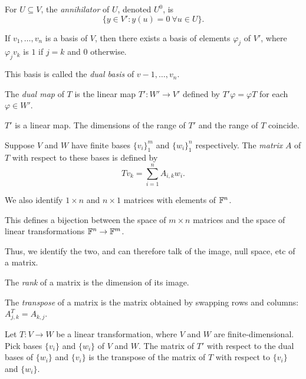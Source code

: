 \begin{defn}
  For $U\subseteq V$, the \emph{annihilator} of $U$, denoted $U^0$, is
  \[\{y\in V': y(u)=0\ \forall u\in U\}.\]
\end{defn}
\begin{defn}
  If $v_1,\ldots,v_n$ is a basis of $V$, then there exists a basis of
  elements $\varphi_j$ of $V'$, where $\varphi_j v_k$ is $1$ if $j=k$ and $0$
  otherwise.
\end{defn}
\begin{defn}
  This basis is called the \emph{dual basis} of
  $v-1,\ldots,v_n$.
\end{defn}
\begin{defn}
  The \emph{dual map} of $T$ is the linear map $T':W'\to V'$ defined by
  $T'\varphi=\varphi T$ for each $\varphi\in W'$.
\end{defn}
\begin{prop}
  $T'$ is a linear map. The dimensions of the range of $T'$ and the range of $T$
  coincide.
\end{prop}
\begin{defn}
  Suppose $V$ and $W$ have finite bases $\{v_i\}_1^m$ and $\{w_i\}_1^n$
  respectively. The \emph{matrix} $A$ of $T$ with respect to these bases is
  defined by
  \[Tv_k=\sum_{i=1}^n A_{i,k}w_i.\]

  We also identify $1\times n$ and $n\times 1$ matrices with elements of
  $\mathbb{F}^n$.
\end{defn}
\begin{prop}
  This defines a bijection between the space of $m\times n$ matrices and the space
  of linear transformations $\mathbb{F}^n\to \mathbb{F}^m$.
\end{prop}
\begin{defn}
  Thus, we identify the two, and can therefore talk of the image, null space,
  etc of a matrix.
\end{defn}
\begin{defn}
  The \emph{rank} of a matrix is the dimension of its image.

  The \emph{transpose} of a matrix is the matrix obtained by swapping rows and
  columns: $A^T_{j,k}=A_{k,j}$.
\end{defn}
\begin{prop}
  Let $T:V\to W$ be a linear transformation, where $V$ and $W$ are
  finite-dimensional. Pick bases $\{v_i\}$ and $\{w_i\}$ 
  of $V$ and $W$. The matrix of $T'$ with respect
  to the dual bases of $\{w_i\}$ and $\{v_i\}$ 
  is the transpose of the matrix of $T$ with respect to $\{v_i\}$ and $\{w_i\}$.
\end{prop}
